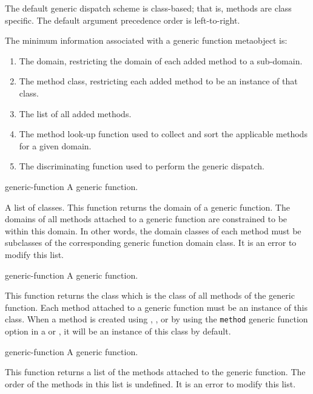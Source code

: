 %
\begin{optDefinition}
The default generic dispatch scheme is class-based; that is, methods
are class specific.  The default argument precedence order is
left-to-right.

The minimum information associated with a generic function metaobject is:

\begin{enumerate}
    \item The domain, restricting the domain of each added method to a
    sub-domain.
    \item The method class, restricting each added method to be an instance
    of that class.
    \item The list of all added methods.
    \item The method look-up function used to collect and sort the
    applicable methods for a given domain.
    \item The discriminating function used to perform the generic dispatch.
\end{enumerate}

%
\begin{arguments}
    \item[generic-function] A generic function.
\end{arguments}
%
\result%
A list of classes.
%
\remarks%
This function returns the domain of a generic function. The domains of all
methods attached to a generic function are constrained to be within this domain.
In other words, the domain classes of each method must be subclasses of the
corresponding generic function domain class.  It is an error to modify this
list.

%
\begin{arguments}
    \item[generic-function] A generic function.
\end{arguments}
%
\result%
This function returns the class which is the class of all methods of the generic
function.  Each method attached to a generic function must be an instance of
this class. When a method is created using ,
, or by using the {\tt method} generic function
option in a  or , it will be an
instance of this class by default.

%
\begin{arguments}
    \item[generic-function] A generic function.
\end{arguments}
%
\result%
This function returns a list of the methods attached to the generic function.
The order of the methods in this list is undefined.  It is an error to modify
this list.


\end{optDefinition}
